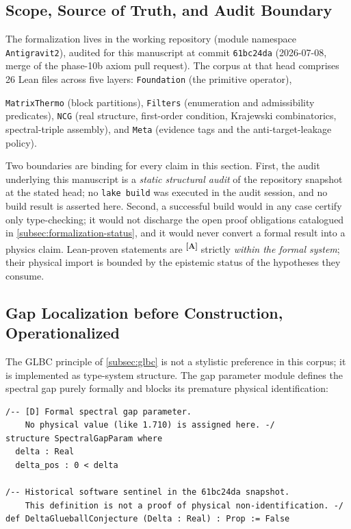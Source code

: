\documentclass[12pt,a4paper,twoside]{article}
\theoremstyle{plain}
\theoremstyle{definition}
\theoremstyle{remark}
\newcommand{\catmark}[1]{\textsuperscript{\textsf{\textbf{[#1]}}}}
\begin{document}
\subsection{Scope, Source of Truth, and Audit Boundary}
\label{subsec:lean-scope}

{\sloppy The formalization lives in the working repository
 (module namespace
\texttt{Antigravit2}), audited for this manuscript at commit
\texttt{61bc24da} (2026-07-08, merge of the phase-10b axiom pull
request). The corpus at that head comprises 26 Lean files across five
layers: \texttt{Foundation} (the primitive operator),\par}
\texttt{MatrixThermo} (block partitions), \texttt{Filters} (enumeration
and admissibility predicates), \texttt{NCG} (real structure, first-order
condition, Krajewski combinatorics, spectral-triple assembly), and
\texttt{Meta} (evidence tags and the anti-target-leakage policy).

Two boundaries are binding for every claim in this section. First, the
audit underlying this manuscript is a \emph{static structural audit} of the
repository snapshot at the stated head; no \texttt{lake build} was
executed in the audit session, and no build result is asserted here.
Second, a successful build would in any case certify only type-checking;
it would not discharge the open proof obligations catalogued in
\cref{subsec:formalization-status}, and it would never convert a formal
result into a physics claim. Lean-proven statements are \catmark{A}
strictly \emph{within the formal system}; their physical import is bounded
by the epistemic status of the hypotheses they consume.

\subsection{Gap Localization before Construction, Operationalized}
\label{subsec:glbc-operational}

The GLBC principle of \cref{subsec:glbc} is not a stylistic preference in
this corpus; it is implemented as type-system structure. The gap parameter
module defines the spectral gap purely formally and blocks its premature
physical identification:

\begin{lstlisting}
/-- [D] Formal spectral gap parameter.
    No physical value (like 1.710) is assigned here. -/
structure SpectralGapParam where
  delta : Real
  delta_pos : 0 < delta

/-- Historical software sentinel in the 61bc24da snapshot.
    This definition is not a proof of physical non-identification. -/
def DeltaGlueballConjecture (Delta : Real) : Prop := False
\end{lstlisting}
\end{document}
